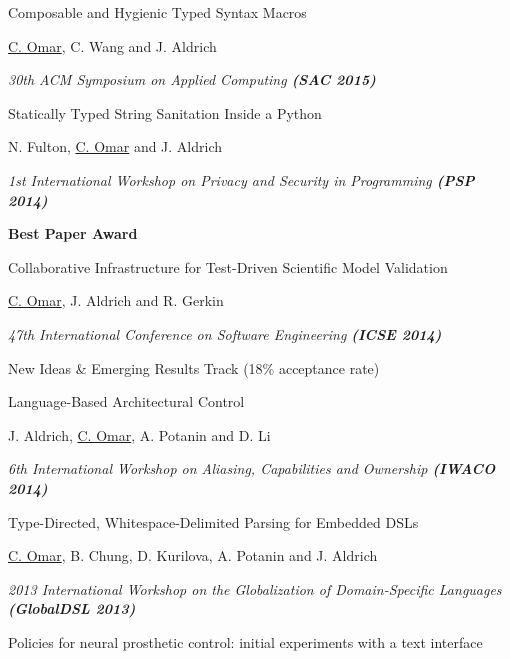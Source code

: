 \documentclass[10pt,letterpaper]{article}
\renewenvironment{itemize}{
  \begin{list}{}{
    \setlength{\leftmargin}{1.5em}
    \setlength{\itemsep}{0.25em}
    \setlength{\parskip}{0pt}
    \setlength{\parsep}{0.25em}
  }
}{
  \end{list}
}
\begin{document}
\begin{enumerate}[resume]
\item Composable and Hygienic Typed Syntax Macros
  \begin{itemize}
    \item \underline{C. Omar}, C. Wang and J. Aldrich
    \item \textit{30th ACM Symposium on Applied Computing \textbf{(SAC 2015)}}
  \end{itemize}
\item Statically Typed String Sanitation Inside a Python
  \begin{itemize}
    \item N. Fulton, \underline{C. Omar} and J. Aldrich
    \item \textit{1st International Workshop on Privacy and Security in Programming \textbf{(PSP 2014)}}
    \item \textbf{Best Paper Award}
  \end{itemize}
\item Collaborative Infrastructure for Test-Driven Scientific Model Validation
  \begin{itemize}
    \item \underline{C. Omar}, J. Aldrich and R. Gerkin
    \item \textit{47th International Conference on Software Engineering \textbf{(ICSE 2014)}}
    \item New Ideas \& Emerging Results Track (18\% acceptance rate)
  \end{itemize}
\item Language-Based Architectural Control
  \begin{itemize}
    \item J. Aldrich, \underline{C. Omar}, A. Potanin and D. Li
    \item \textit{6th International Workshop on Aliasing, Capabilities and Ownership \textbf{(IWACO 2014)}}
  \end{itemize}
\item Type-Directed, Whitespace-Delimited Parsing for Embedded DSLs
  \begin{itemize}
    \item \underline{C. Omar}, B. Chung, D. Kurilova, A. Potanin and J. Aldrich
    \item \textit{2013 International Workshop on the Globalization of Domain-Specific Languages \textbf{(GlobalDSL 2013)}}
  \end{itemize}
\item Policies for neural prosthetic control: initial experiments with a text interface

\end{enumerate}
\end{document}
